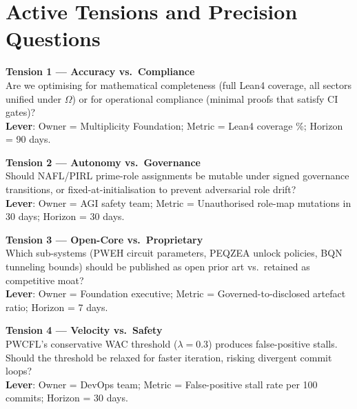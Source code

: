 \documentclass[12pt,a4paper]{article}
\theoremstyle{definition}
\theoremstyle{plain}
\theoremstyle{remark}
\begin{document}
\newpage

\section{Active Tensions and Precision Questions}
\label{sec:tensions}

\begin{mdframed}[linecolor=multGold, linewidth=1.5pt]
\textbf{Tension 1 --- Accuracy vs.\ Compliance}\\[0.2em]
Are we optimising for mathematical completeness (full Lean4 coverage, all
sectors unified under $\Omega$) or for operational compliance (minimal proofs
that satisfy CI gates)?\\[0.3em]
\textbf{Lever}: Owner = Multiplicity Foundation;
Metric = Lean4 coverage \%;
Horizon = 90 days.
\end{mdframed}

\vspace{0.8em}
\begin{mdframed}[linecolor=multGold, linewidth=1.5pt]
\textbf{Tension 2 --- Autonomy vs.\ Governance}\\[0.2em]
Should NAFL/PIRL prime-role assignments be mutable under signed governance
transitions, or fixed-at-initialisation to prevent adversarial role drift?\\[0.3em]
\textbf{Lever}: Owner = AGI safety team;
Metric = Unauthorised role-map mutations in 30 days;
Horizon = 30 days.
\end{mdframed}

\vspace{0.8em}
\begin{mdframed}[linecolor=multGold, linewidth=1.5pt]
\textbf{Tension 3 --- Open-Core vs.\ Proprietary}\\[0.2em]
Which sub-systems (PWEH circuit parameters, PEQZEA unlock policies, BQN
tunneling bounds) should be published as open prior art vs.\ retained as
competitive moat?\\[0.3em]
\textbf{Lever}: Owner = Foundation executive;
Metric = Governed-to-disclosed artefact ratio;
Horizon = 7 days.
\end{mdframed}

\vspace{0.8em}
\begin{mdframed}[linecolor=multGold, linewidth=1.5pt]
\textbf{Tension 4 --- Velocity vs.\ Safety}\\[0.2em]
PWCFL's conservative WAC threshold ($\lambda = 0.3$) produces false-positive
stalls. Should the threshold be relaxed for faster iteration, risking divergent
commit loops?\\[0.3em]
\textbf{Lever}: Owner = DevOps team;
Metric = False-positive stall rate per 100 commits;
Horizon = 30 days.
\end{mdframed}
\end{document}

